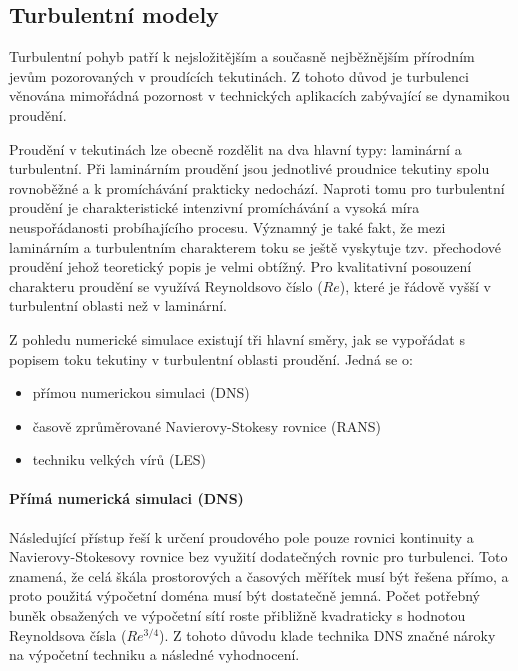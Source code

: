 \subsection{Turbulentní modely}
Turbulentní pohyb patří k nejsložitějším a současně nejběžnějším přírodním jevům pozorovaných v proudících tekutinách. Z tohoto důvod je turbulenci věnována mimořádná pozornost v technických aplikacích zabývající se dynamikou proudění. 

Proudění v tekutinách lze obecně rozdělit na dva hlavní typy: laminární a turbulentní. Při laminárním proudění jsou jednotlivé proudnice tekutiny spolu rovnoběžné a k promíchávání prakticky nedochází. Naproti tomu pro turbulentní proudění je charakteristické intenzivní promíchávání a vysoká míra neuspořádanosti probíhajícího procesu. Významný je také fakt, že mezi laminárním a turbulentním charakterem toku se ještě vyskytuje tzv. přechodové proudění jehož teoretický popis je velmi obtížný. Pro kvalitativní posouzení charakteru proudění se využívá Reynoldsovo číslo ($Re$), které je řádově vyšší v turbulentní oblasti než v laminární. 

Z pohledu numerické simulace existují tři hlavní směry, jak se vypořádat s popisem toku tekutiny v turbulentní oblasti proudění. Jedná se o:
\begin{itemize}[itemsep=0pt,parsep=0pt,partopsep=0pt,topsep=0pt]
  \item přímou numerickou simulaci (DNS)
  \item časově zprůměrované Navierovy-Stokesy rovnice (RANS)
  \item techniku velkých vírů (LES)
\end{itemize}

\paragraph{Přímá numerická simulaci (DNS)}
Následující přístup řeší k určení proudového pole pouze rovnici kontinuity a Navierovy-Stokesovy rovnice bez využití dodatečných rovnic pro turbulenci. Toto znamená, že celá škála prostorových a časových měřítek musí být řešena přímo, a proto použitá výpočetní doména musí být dostatečně jemná. Počet potřebný buněk obsažených ve výpočetní sítí roste přibližně kvadraticky s hodnotou Reynoldsova čísla ($Re^{3/4}$). Z tohoto důvodu klade technika DNS značné nároky na výpočetní techniku a následné vyhodnocení.

